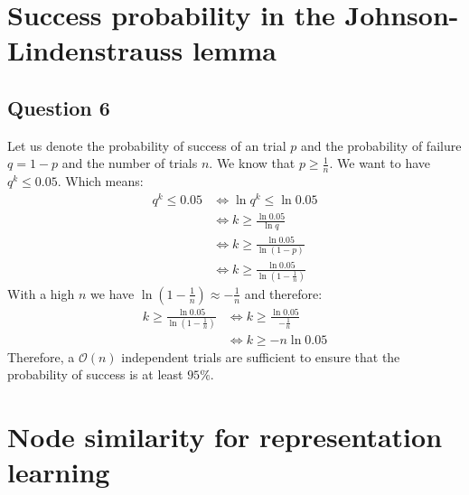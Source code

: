 \documentclass{article}
\begin{document}
\section{Success probability in the Johnson-Lindenstrauss lemma}

\subsection{Question 6}
Let us denote the probability of success of an trial $p$ and the probability of failure $q = 1 - p$ and the number of trials $n$. We know that $p \geq \frac{1}{n}$. We want to have $q^k \leq 0.05$. Which means:
\begin{align*}
  q^k     \leq 0.05 & \Leftrightarrow \ln q^k \leq \ln 0.05                         \\
                    & \Leftrightarrow k \geq \frac{\ln 0.05}{\ln q}                 \\
                    & \Leftrightarrow k \geq \frac{\ln 0.05}{\ln (1 - p)}           \\
                    & \Leftrightarrow k \geq \frac{\ln 0.05}{\ln (1 - \frac{1}{n})}
\end{align*}
With a high $n$ we have $\ln (1 - \frac{1}{n}) \approx -\frac{1}{n}$ and therefore:
\begin{align*}
  k \geq \frac{\ln 0.05}{\ln (1 - \frac{1}{n})} & \Leftrightarrow k \geq \frac{\ln 0.05}{-\frac{1}{n}} \\
                                                & \Leftrightarrow k \geq -n \ln 0.05
\end{align*}
Therefore, a $\mathcal{O}(n)$ independent trials are sufficient to ensure that the probability of success is at least $95\%$.

\section{Node similarity for representation learning}
\end{document}
